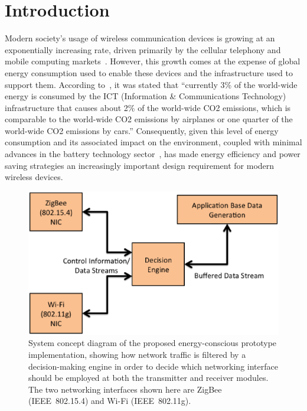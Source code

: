 \documentclass[conference]{IEEEtran}
\begin{document}
\section{Introduction}

Modern society's usage of wireless communication devices is growing
at an exponentially increasing rate, driven primarily by the
cellular telephony and mobile computing markets~\cite{two}. However,
this growth comes at the expense of global energy consumption used
to enable these devices and the infrastructure used to support them.
According to~\cite{three}, it was stated that ``currently 3\% of the
world-wide energy is consumed by the ICT (Information \&
Communications Technology) infrastructure that causes about 2\% of
the world-wide CO2 emissions, which is comparable to the world-wide
CO2 emissions by airplanes or one quarter of the world-wide CO2
emissions by cars.''  Consequently, given this level of energy
consumption and its associated impact on the environment, coupled
with minimal advances in the battery technology sector~\cite{five},
has made energy efficiency and power saving strategies an
increasingly important design requirement for modern wireless
devices.
\begin{figure}[t]
\begin{center}
\includegraphics[scale=0.35]{concept_diagram.eps}
\caption{System concept diagram of the proposed energy-conscious
prototype implementation, showing how network traffic is filtered by
a decision-making engine in order to decide which
networking interface should be employed at both the transmitter and
receiver modules. The two networking interfaces shown here are
ZigBee (IEEE~802.15.4) and Wi-Fi (IEEE~802.11g).}
\end{center}\label{f:concept}
\end{figure}
\end{document}
